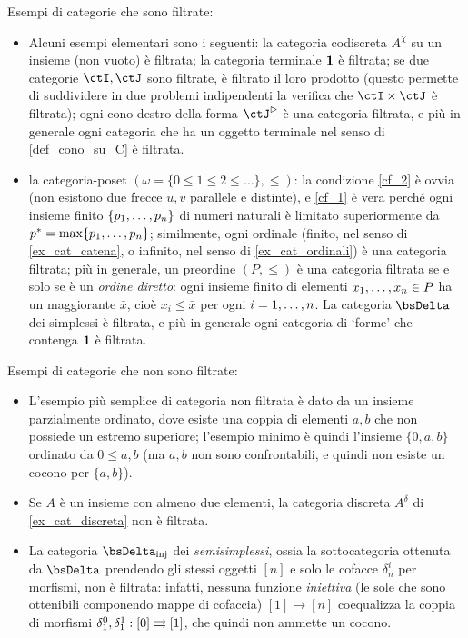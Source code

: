 \begin{examples}\label{contro_esempi_filt}
	Esempi di categorie che sono filtrate:
	\begin{itemize}
		\item Alcuni esempi elementari sono i seguenti: la categoria codiscreta \(A^\chi\) su un insieme (non vuoto) è filtrata; la categoria terminale \(\mathbf{1}\) è filtrata; se due categorie \(\ctI,\ctJ\) sono filtrate, è filtrato il loro prodotto (questo permette di suddividere in due problemi indipendenti la verifica che \(\ctI\times\ctJ\) è filtrata); ogni cono destro della forma \(\ctJ^\rhd\) è una categoria filtrata, e più in generale ogni categoria che ha un oggetto terminale nel senso di \ref{def_cono_su_C} è filtrata.
		\item la categoria-poset \((\omega=\{0\le 1\le 2\le\dots\},\le)\): la condizione \ref{cf_2} è ovvia (non esistono due frecce \(u,v\) parallele e distinte), e \ref{cf_1} è vera perché ogni insieme finito \(\{\tup pn,\}\) di numeri naturali è limitato superiormente da \(p^*=\max\{\tup pn,\}\); similmente, ogni ordinale (finito, nel senso di \ref{ex_cat_catena}, o infinito, nel senso di \ref{ex_cat_ordinali}) è una categoria filtrata; più in generale, un preordine \((P,\le)\) è una categoria filtrata se e solo se è un \emph{ordine diretto}: ogni insieme finito di elementi \(\tup xn, \in P\) ha un maggiorante \(\bar x\), cioè \(x_i\le \bar x\) per ogni \(i=\iter n\). La categoria \(\bsDelta\) dei simplessi è filtrata, e più in generale ogni categoria di `forme' che contenga \(\mathbf{1}\) è filtrata.
	\end{itemize}
	Esempi di categorie che non sono filtrate:
	\begin{itemize}
		\item L'esempio più semplice di categoria non filtrata è dato da un insieme parzialmente ordinato, dove esiste una coppia di elementi \(a,b\) che non possiede un estremo superiore; l'esempio minimo è quindi l'insieme \(\{0,a,b\}\) ordinato da \(0\le a,b\) (ma \(a,b\) non sono confrontabili, e quindi non esiste un cocono per \(\{a,b\}\)).
		\item Se \(A\) è un insieme con almeno due elementi, la categoria discreta \(A^\delta\) di \ref{ex_cat_discreta} non è filtrata.
		\item La categoria \(\bsDelta_\text{inj}\) dei \emph{semisimplessi}, ossia la sottocategoria ottenuta da \(\bsDelta\) prendendo gli stessi oggetti \([n]\) e solo le cofacce \(\delta_n^i\) per morfismi, non è filtrata: infatti, nessuna funzione \emph{iniettiva} (le sole che sono ottenibili componendo mappe di cofaccia) \([1] \to [n]\) coequalizza la coppia di morfismi \(\delta_1^0,\delta_1^1 : [0]\rightrightarrows [1]\), che quindi non ammette un cocono.
	\end{itemize}
\end{examples}
